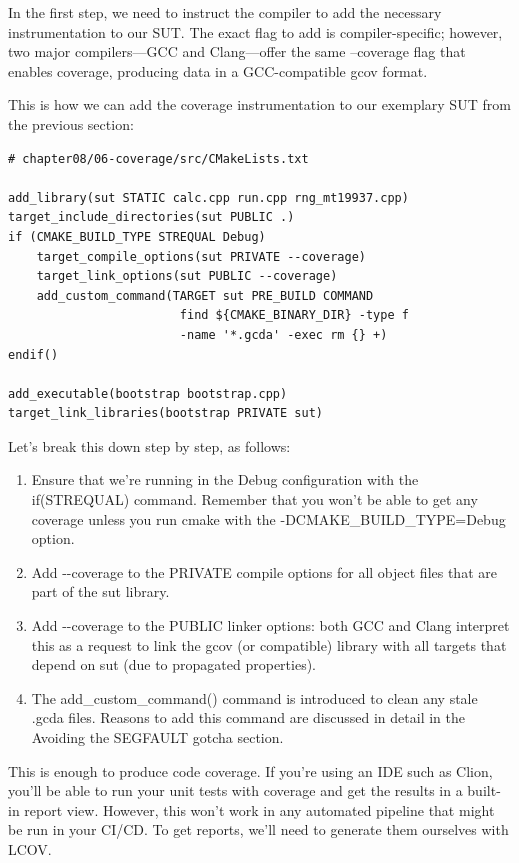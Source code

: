 In the first step, we need to instruct the compiler to add the necessary instrumentation to our SUT. The exact flag to add is compiler-specific; however, two major compilers—GCC and Clang—offer the same --coverage flag that enables coverage, producing data in a GCC-compatible gcov format.

This is how we can add the coverage instrumentation to our exemplary SUT from the previous section:

\begin{lstlisting}[style=styleCMake]
# chapter08/06-coverage/src/CMakeLists.txt

add_library(sut STATIC calc.cpp run.cpp rng_mt19937.cpp)
target_include_directories(sut PUBLIC .)
if (CMAKE_BUILD_TYPE STREQUAL Debug)
	target_compile_options(sut PRIVATE --coverage)
	target_link_options(sut PUBLIC --coverage)
	add_custom_command(TARGET sut PRE_BUILD COMMAND
						find ${CMAKE_BINARY_DIR} -type f
						-name '*.gcda' -exec rm {} +)
endif()

add_executable(bootstrap bootstrap.cpp)
target_link_libraries(bootstrap PRIVATE sut)
\end{lstlisting}

Let's break this down step by step, as follows:

\begin{enumerate}
\item 
Ensure that we're running in the Debug configuration with the if(STREQUAL) command. Remember that you won't be able to get any coverage unless you run cmake with the -DCMAKE\_BUILD\_TYPE=Debug option.

\item 
Add -{}-coverage to the PRIVATE compile options for all object files that are part of the sut library.

\item 
Add -{}-coverage to the PUBLIC linker options: both GCC and Clang interpret this as a request to link the gcov (or compatible) library with all targets that depend on sut (due to propagated properties).

\item 
The add\_custom\_command() command is introduced to clean any stale .gcda files. Reasons to add this command are discussed in detail in the Avoiding the SEGFAULT gotcha section.
\end{enumerate}

This is enough to produce code coverage. If you're using an IDE such as Clion, you'll be able to run your unit tests with coverage and get the results in a built-in report view. However, this won't work in any automated pipeline that might be run in your CI/CD. To get reports, we'll need to generate them ourselves with LCOV.

